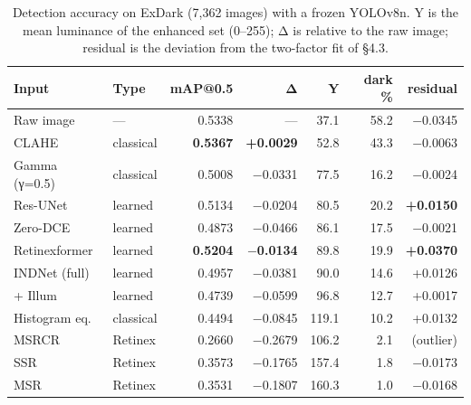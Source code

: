 
\begin{table}[t]
\centering
\small
\caption{Detection accuracy on ExDark (7,362 images) with a frozen YOLOv8n. Y is the mean luminance of the enhanced set (0–255); Δ is relative to the raw image; residual is the deviation from the two-factor fit of §4.3.}
\label{tab:table1}
\begin{tabular}{llrrrrr}
\toprule
Input & Type & mAP@0.5 & Δ & Y & dark \% & residual \\
\midrule
Raw image & — & 0.5338 & — & 37.1 & 58.2 & $-$0.0345 \\
CLAHE & classical & \textbf{0.5367} & \textbf{+0.0029} & 52.8 & 43.3 & $-$0.0063 \\
Gamma (γ=0.5) & classical & 0.5008 & $-$0.0331 & 77.5 & 16.2 & $-$0.0024 \\
Res-UNet & learned & 0.5134 & $-$0.0204 & 80.5 & 20.2 & \textbf{+0.0150} \\
Zero-DCE & learned & 0.4873 & $-$0.0466 & 86.1 & 17.5 & $-$0.0021 \\
Retinexformer & learned & \textbf{0.5204} & \textbf{$-$0.0134} & 89.8 & 19.9 & \textbf{+0.0370} \\
INDNet (full) & learned & 0.4957 & $-$0.0381 & 90.0 & 14.6 & +0.0126 \\
+ Illum & learned & 0.4739 & $-$0.0599 & 96.8 & 12.7 & +0.0017 \\
Histogram eq. & classical & 0.4494 & $-$0.0845 & 119.1 & 10.2 & +0.0132 \\
MSRCR & Retinex & 0.2660 & $-$0.2679 & 106.2 & 2.1 & (outlier) \\
SSR & Retinex & 0.3573 & $-$0.1765 & 157.4 & 1.8 & $-$0.0173 \\
MSR & Retinex & 0.3531 & $-$0.1807 & 160.3 & 1.0 & $-$0.0168 \\
\bottomrule
\end{tabular}
\end{table}

